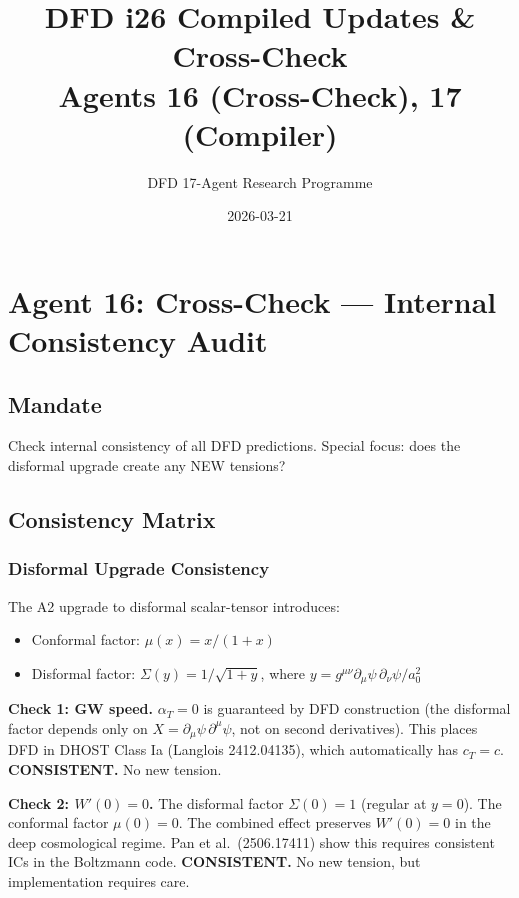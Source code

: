 \documentclass[11pt,a4paper]{article}
\title{DFD i26 Compiled Updates \& Cross-Check\\Agents 16 (Cross-Check), 17 (Compiler)}
\author{DFD 17-Agent Research Programme}
\date{2026-03-21}
\begin{document}
\maketitle
\tableofcontents
\newpage

\section{Agent 16: Cross-Check --- Internal Consistency Audit}

\subsection{Mandate}
Check internal consistency of all DFD predictions. Special focus: does the disformal upgrade create any NEW tensions?

\subsection{Consistency Matrix}

\subsubsection{Disformal Upgrade Consistency}

The A2 upgrade to disformal scalar-tensor introduces:
\begin{itemize}
\item Conformal factor: $\mu(x) = x/(1+x)$
\item Disformal factor: $\Sigma(y) = 1/\sqrt{1+y}$, where $y = g^{\mu\nu}\partial_\mu\psi\,\partial_\nu\psi / a_0^2$
\end{itemize}

\textbf{Check 1: GW speed.} $\alpha_T = 0$ is guaranteed by DFD construction (the disformal factor depends only on $X = \partial_\mu\psi\,\partial^\mu\psi$, not on second derivatives). This places DFD in DHOST Class Ia (Langlois 2412.04135), which automatically has $c_T = c$. \textbf{CONSISTENT.} No new tension.

\textbf{Check 2: $W'(0) = 0$.} The disformal factor $\Sigma(0) = 1$ (regular at $y=0$). The conformal factor $\mu(0) = 0$. The combined effect preserves $W'(0) = 0$ in the deep cosmological regime. Pan et al.\ (2506.17411) show this requires consistent ICs in the Boltzmann code. \textbf{CONSISTENT.} No new tension, but implementation requires care.
\end{document}
